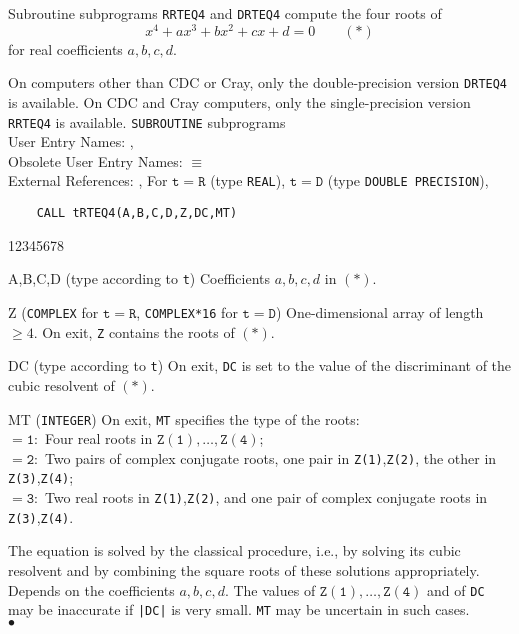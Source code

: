                           
                   
\Submitter{ }                            
                      
Subroutine subprograms {\tt RRTEQ4} and  {\tt DRTEQ4}
compute the four roots of
  $$ x^4 + ax^3 + bx^2 + cx + d = 0 \qquad        (*)   $$
for real coefficients $a,b,c,d$.
\par
On computers other than CDC or Cray, only the double-precision version
{\tt DRTEQ4} is available. On CDC and Cray computers, only the
single-precision version {\tt RRTEQ4} is available.
\Structure
{\tt SUBROUTINE} subprograms\\
User Entry Names:  , \\
Obsolete User Entry Names:  $\equiv$  \\
External References: , 
\Usage
For $\mathtt{t=R}$ (type {\tt REAL}), $\mathtt{t=D}$ (type
{\tt DOUBLE PRECISION}),
\begin{verbatim}
    CALL tRTEQ4(A,B,C,D,Z,DC,MT)
\end{verbatim}
\begin{DLtt}{12345678}
\item[A,B,C,D] (type according to {\tt t})
Coefficients $a,b,c,d$ in $(*)$.
\item[Z] ({\tt COMPLEX} for $\mathtt{t=R}$, {\tt COMPLEX*16} for
$\mathtt{t=D}$) One-dimensional array of length $\ge 4$. On exit,
{\tt Z} contains the roots of $(*)$.
\item[DC] (type according to {\tt t}) On exit, {\tt DC} is set to
the value of the discriminant of the cubic resolvent of $(*)$.
\item[MT] ({\tt INTEGER})
On exit, {\tt MT} specifies the type of the roots: \\
$\mathtt{= 1:}$ Four real roots in $\mathtt{Z(1)},\ldots,
\mathtt{Z(4)}$; \\
$\mathtt{= 2:}$ Two pairs of complex conjugate roots, one pair in
{\tt Z(1)},{\tt Z(2)}, the other in {\tt Z(3)},{\tt Z(4)}; \\
$\mathtt{= 3:}$ Two real roots in {\tt Z(1)},{\tt Z(2)}, and one pair
of complex conjugate roots in {\tt Z(3)},{\tt Z(4)}.
\end{DLtt}
\Method
The equation is solved by the classical procedure, i.e., by
solving its cubic resolvent and by combining the square roots
of these solutions appropriately.
\Accuracy
Depends on the coefficients $a,b,c,d$. The values of
$\mathtt{Z(1)},\ldots,\mathtt{Z(4)}$ and of {\tt DC} may be inaccurate if
{\tt |DC|} is very small. {\tt MT} may be uncertain in such cases.
\\ $\bullet$
